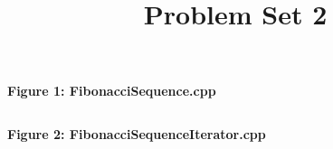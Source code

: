\documentclass[12pt, letterpaper]{article}
\title{Problem Set 2}
\author{}
\date{}
\newcommand{\includeminted}[3]
{
  \begin{center}
  \textbf{#1}
  \vspace{-5pt}
  \inputminted[linenos, breaklines]{#2}{#3}
  \end{center}
}
\begin{document}
\normalsize
\includeminted{Figure 1: FibonacciSequence.cpp}{csharp}{../src/FibonacciSequence.cpp}
\clearpage
\includeminted{Figure 2: FibonacciSequenceIterator.cpp}{csharp}{../src/FibonacciSequenceIterator.cpp}
\end{document}
